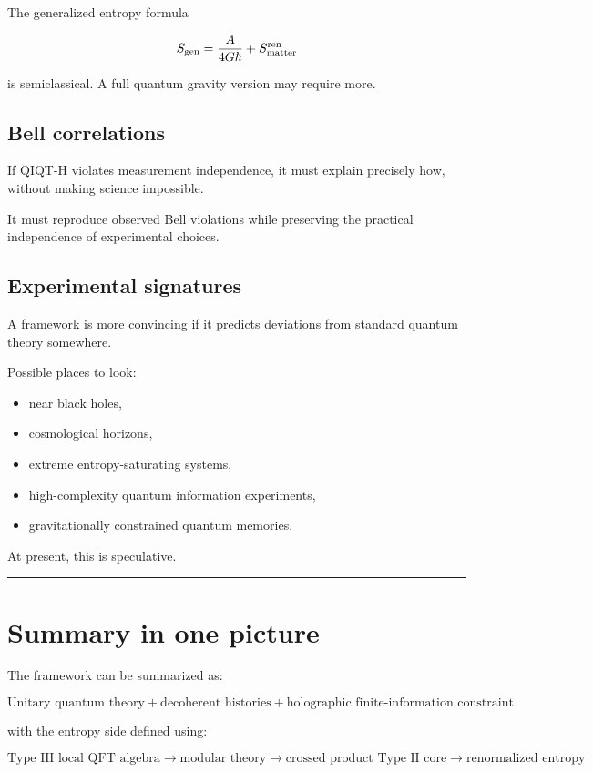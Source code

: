\documentclass[11pt,a4paper]{article}
\begin{document}
The generalized entropy formula

\[
S_{\rm gen}=\frac{A}{4G\hbar}+S_{\rm matter}^{\rm ren}
\]

is semiclassical. A full quantum gravity version may require more.

\subsection{Bell correlations}

If QIQT-H violates measurement independence, it must explain precisely how, without making science impossible.

It must reproduce observed Bell violations while preserving the practical independence of experimental choices.

\subsection{Experimental signatures}

A framework is more convincing if it predicts deviations from standard quantum theory somewhere.

Possible places to look:

\begin{itemize}
  \item near black holes,
  \item cosmological horizons,
  \item extreme entropy-saturating systems,
  \item high-complexity quantum information experiments,
  \item gravitationally constrained quantum memories.
\end{itemize}

At present, this is speculative.

\medskip\hrule\medskip

\section{Summary in one picture}

The framework can be summarized as:

\[
\boxed{
\text{Unitary quantum theory}
+
\text{decoherent histories}
+
\text{holographic finite-information constraint}
}
\]

with the entropy side defined using:

\[
\boxed{
\text{Type III local QFT algebra}
\rightarrow
\text{modular theory}
\rightarrow
\text{crossed product Type II core}
\rightarrow
\text{renormalized entropy}
}
\]
\end{document}

